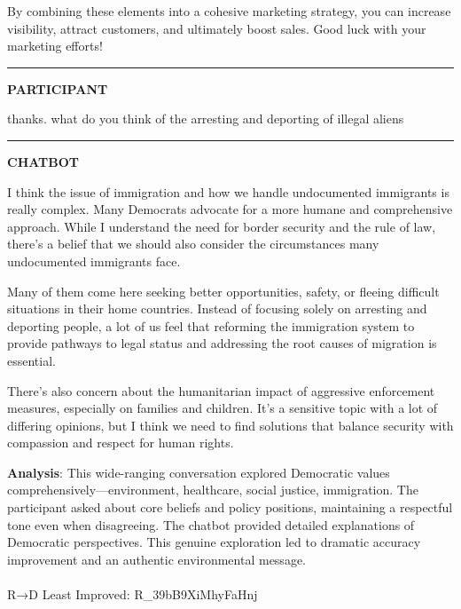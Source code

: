 \documentclass[
  11pt,
  oneside]{article}
\makeatletter
\let\oldparagraph\paragraph
\renewcommand{\paragraph}{
    \@ifstar
      \xxxParagraphStar
      \xxxParagraphNoStar
  }
\newcommand{\xxxParagraphStar}[1]{\oldparagraph*{#1}\mbox{}}
\newcommand{\xxxParagraphNoStar}[1]{\oldparagraph{#1}\mbox{}}
\makeatother
\begin{document}
By combining these elements into a cohesive marketing strategy, you can
increase visibility, attract customers, and ultimately boost sales. Good
luck with your marketing efforts!

\begin{center}\rule{0.5\linewidth}{0.5pt}\end{center}

\textbf{PARTICIPANT}

thanks. what do you think of the arresting and deporting of illegal
aliens

\begin{center}\rule{0.5\linewidth}{0.5pt}\end{center}

\textbf{CHATBOT}

I think the issue of immigration and how we handle undocumented
immigrants is really complex. Many Democrats advocate for a more humane
and comprehensive approach. While I understand the need for border
security and the rule of law, there's a belief that we should also
consider the circumstances many undocumented immigrants face.

Many of them come here seeking better opportunities, safety, or fleeing
difficult situations in their home countries. Instead of focusing solely
on arresting and deporting people, a lot of us feel that reforming the
immigration system to provide pathways to legal status and addressing
the root causes of migration is essential.

There's also concern about the humanitarian impact of aggressive
enforcement measures, especially on families and children. It's a
sensitive topic with a lot of differing opinions, but I think we need to
find solutions that balance security with compassion and respect for
human rights.

\textbf{Analysis}: This wide-ranging conversation explored Democratic
values comprehensively---environment, healthcare, social justice,
immigration. The participant asked about core beliefs and policy
positions, maintaining a respectful tone even when disagreeing. The
chatbot provided detailed explanations of Democratic perspectives. This
genuine exploration led to dramatic accuracy improvement and an
authentic environmental message.

\paragraph{R→D Least Improved:
R\_39bB9XiMhyFaHnj}\label{rd-least-improved-r_39bb9ximhyfahnj}
\end{document}
